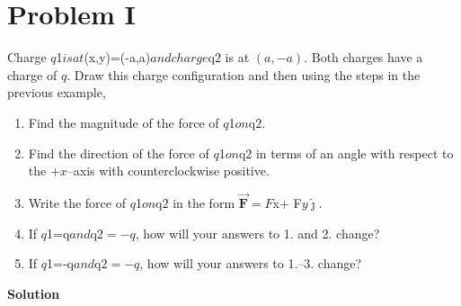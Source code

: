 \documentclass{article}
\renewcommand{\mbox}{\text}
\newcommand{\ihat}[0]{\hat{\boldsymbol{\imath}}}
\newcommand{\jhat}[0]{\hat{\boldsymbol{\jmath}}}
\newcommand{\bfvec}[1]{\vec{\mathbf{#1}}}
\begin{document}

\section{Problem I}

Charge $q$1$ is at $(x,y)=(-a,a)$ and charge $q$2$ is at $(a, -a)$. Both charges have a charge of $q$. Draw this charge configuration and then using the steps in the previous example,

\begin{enumerate}

  \item Find the magnitude of the force of $q$1$ on $q$2$.

  \item Find the direction of the force of $q$1$ on $q$2$ in terms of an angle with respect to the $+x$--axis with counterclockwise positive.

  \item Write the force of $q$1$ on $q$2$ in the form $\bfvec{F}=F$x\ihat + F$y\jhat$.

  \item If $q$1=q$ and $q$2=-q$, how will your answers to 1. and 2. change?

  \item If $q$1=-q$ and $q$2=-q$, how will your answers to 1.--3. change?

\end{enumerate}

\ifsolutions
{\bf Solution}
\end{document}
